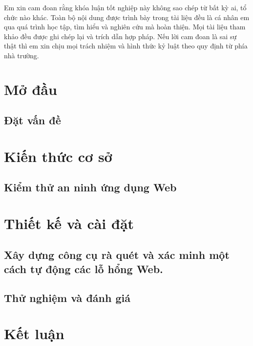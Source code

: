 \documentclass[12pt,a4paper]{report}
\begin{document}
Em xin cam đoan rằng khóa luận tốt nghiệp này không sao chép từ bất kỳ ai, tổ chức nào khác. Toàn bộ nội dung được trình bày trong tài liệu đều là cá nhân em qua quá trình học tập, tìm hiểu và nghiên cứu mà hoàn thiện. Mọi tài liệu tham khảo đều được ghi chép lại và trích dẫn hợp pháp. Nếu lời cam đoan là sai sự thật thì em xin chịu mọi trách nhiệm và hình thức kỷ luật theo quy định từ phía nhà trường.

\tableofcontents{}
\clearpage{}

\listoffigures{}

\listoftables{}

\chapter{Mở đầu}

\section{Đặt vấn đề}


\chapter{Kiến thức cơ sở}

\section{Kiểm thử an ninh ứng dụng Web}


\chapter{Thiết kế và cài đặt}
\section{Xây dựng công cụ rà quét và xác minh một cách tự động các lỗ hổng Web.}


\section{Thử nghiệm và đánh giá}


\chapter{Kết luận}



\nocite{*}
\printbibliography[heading=bibintoc, title=Tài liệu tham khảo]

\end{document}
